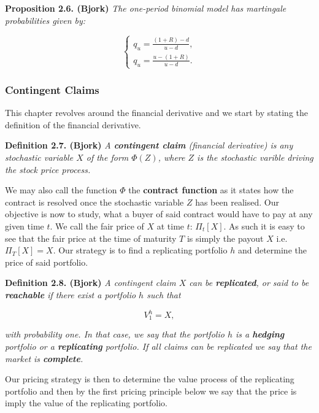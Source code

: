 \documentclass[
]{book}
\begin{document}
\textbf{Proposition 2.6. (Bjork)} \emph{The one-period binomial model has martingale probabilities given by:}

\[\left\{\begin{matrix}q_u=\frac{(1+R)-d}{u-d},\\ q_u=\frac{u-(1+R)}{u-d}.\end{matrix}\right.\]

\hypertarget{contingent-claims}{%
\subsubsection{Contingent Claims}\label{contingent-claims}}

This chapter revolves around the financial derivative and we start by stating the definition of the financial derivative.

\textbf{Definition 2.7. (Bjork)} \emph{A \textbf{contingent claim} (financial derivative) is \emph{any} stochastic variable \(X\) of the form \(\Phi(Z)\), where \(Z\) is the stochastic varible driving the stock price process.}

We may also call the function \(\Phi\) the \textbf{contract function} as it states how the contract is resolved once the stochastic variable \(Z\) has been realised. Our objective is now to study, what a buyer of said contract would have to pay at any given time \(t\). We call the fair price of \(X\) at time \(t\): \(\Pi_t[X]\). As such it is easy to see that the fair price at the time of maturity \(T\) is simply the payout \(X\) i.e.~\(\Pi_T[X]=X\). Our strategy is to find a replicating portfolio \(h\) and determine the price of said portfolio.

\textbf{Definition 2.8. (Bjork)} \emph{A contingent claim \(X\) can be \textbf{replicated}, or said to be \textbf{reachable} if there exist a portfolio \(h\) such that}

\[
V_1^h=X,
\]

\emph{with probability one. In that case, we say that the portfolio \(h\) is a \textbf{hedging} portfolio or a \textbf{replicating} portfolio. If all claims can be replicated we say that the market is \textbf{complete}.}

Our pricing strategy is then to determine the value process of the replicating portfolio and then by the first pricing principle below we say that the price is imply the value of the replicating portfolio.
\end{document}
